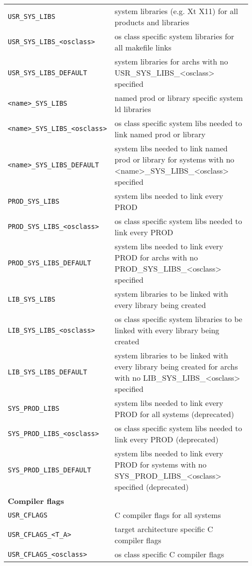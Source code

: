 \begin{center}
\begin{longtable}{p{2.94784in}p{3.76247in}}
\verb|USR_SYS_LIBS| & system libraries (e.g. Xt X11) for all products and libraries\\
\verb|USR_SYS_LIBS_<osclass>| & os class specific system libraries for all makefile links\\
\verb|USR_SYS_LIBS_DEFAULT| & system libraries for archs with no USR\_SYS\_LIBS\_\textless{}osclass\textgreater{} specified\\
\verb|<name>_SYS_LIBS| & named prod or library specific system ld libraries\\
\verb|<name>_SYS_LIBS_<osclass>| & os class specific system libs needed to link named prod or library\\
\verb|<name>_SYS_LIBS_DEFAULT| & system libs needed to link named prod or library for systems with no \textless{}name\textgreater{}\_SYS\_LIBS\_\textless{}osclass\textgreater{} specified\\
\verb|PROD_SYS_LIBS| & system libs needed to link every PROD\\
\verb|PROD_SYS_LIBS_<osclass>| & os class specific system libs needed to link every PROD\\
\verb|PROD_SYS_LIBS_DEFAULT| & system libs needed to link every PROD for archs with no PROD\_SYS\_LIBS\_\textless{}osclass\textgreater{} specified\\
\verb|LIB_SYS_LIBS| & system libraries to be linked with every library being created\\
\verb|LIB_SYS_LIBS_<osclass>| & os class specific system libraries to be linked with every library being created\\
\verb|LIB_SYS_LIBS_DEFAULT| & system libraries to be linked with every library being created for archs with no LIB\_SYS\_LIBS\_\textless{}osclass\textgreater{} specified\\
\verb|SYS_PROD_LIBS| & system libs needed to link every PROD for all systems (deprecated)\\
\verb|SYS_PROD_LIBS_<osclass>| & os class specific system libs needed to link every PROD (deprecated)\\
\verb|SYS_PROD_LIBS_DEFAULT| & system libs needed to link every PROD for systems with no SYS\_PROD\_LIBS\_\textless{}osclass\textgreater{} specified (deprecated)\\
\textbf{Compiler flags} & \\
\verb|USR_CFLAGS| & C compiler flags for all systems\\
\verb|USR_CFLAGS_<T_A>| & target architecture specific C compiler flags\\
\verb|USR_CFLAGS_<osclass>| & os class specific C compiler flags\\

\end{longtable}
\end{center}
